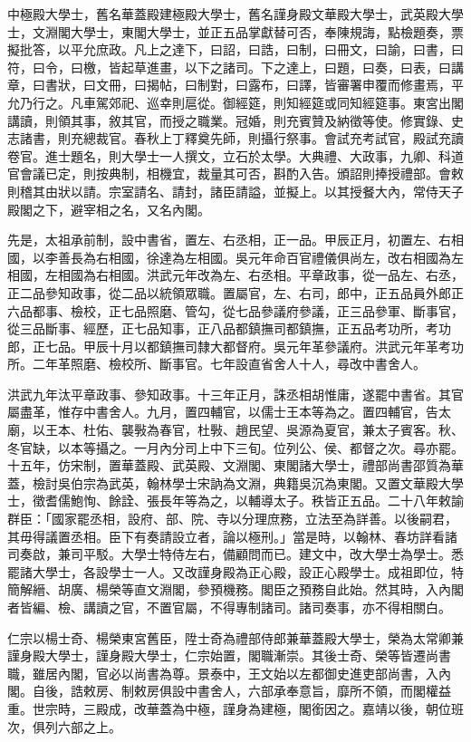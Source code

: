 中極殿大學士，舊名華蓋殿建極殿大學士，舊名謹身殿文華殿大學士，武英殿大學士，文淵閣大學士，東閣大學士，並正五品掌獻替可否，奉陳規誨，點檢題奏，票擬批答，以平允庶政。凡上之達下，曰詔，曰誥，曰制，曰冊文，曰諭，曰書，曰符，曰令，曰檄，皆起草進畫，以下之諸司。下之達上，曰題，曰奏，曰表，曰講章，曰書狀，曰文冊，曰揭帖，曰制對，曰露布，曰譯，皆審署申覆而修畫焉，平允乃行之。凡車駕郊祀、巡幸則扈從。御經筵，則知經筵或同知經筵事。東宮出閣講讀，則領其事，敘其官，而授之職業。冠婚，則充賓贊及納徵等使。修實錄、史志諸書，則充總裁官。春秋上丁釋奠先師，則攝行祭事。會試充考試官，殿試充讀卷官。進士題名，則大學士一人撰文，立石於太學。大典禮、大政事，九卿、科道官會議已定，則按典制，相機宜，裁量其可否，斟酌入告。頒詔則捧授禮部。會敕則稽其由狀以請。宗室請名、請封，諸臣請謚，並擬上。以其授餐大內，常侍天子殿閣之下，避宰相之名，又名內閣。

先是，太祖承前制，設中書省，置左、右丞相，正一品。甲辰正月，初置左、右相國，以李善長為右相國，徐達為左相國。吳元年命百官禮儀俱尚左，改右相國為左相國，左相國為右相國。洪武元年改為左、右丞相。平章政事，從一品左、右丞，正二品參知政事，從二品以統領眾職。置屬官，左、右司，郎中，正五品員外郎正六品都事、檢校，正七品照磨、管勾，從七品參議府參議，正三品參軍、斷事官，從三品斷事、經歷，正七品知事，正八品都鎮撫司都鎮撫，正五品考功所，考功郎，正七品。甲辰十月以都鎮撫司隸大都督府。吳元年革參議府。洪武元年革考功所。二年革照磨、檢校所、斷事官。七年設直省舍人十人，尋改中書舍人。

洪武九年汰平章政事、參知政事。十三年正月，誅丞相胡惟庸，遂罷中書省。其官屬盡革，惟存中書舍人。九月，置四輔官，以儒士王本等為之。置四輔官，告太廟，以王本、杜佑、襲斅為春官，杜斅、趙民望、吳源為夏官，兼太子賓客。秋、冬官缺，以本等攝之。一月內分司上中下三旬。位列公、侯、都督之次。尋亦罷。十五年，仿宋制，置華蓋殿、武英殿、文淵閣、東閣諸大學士，禮部尚書邵質為華蓋，檢討吳伯宗為武英，翰林學士宋訥為文淵，典籍吳沉為東閣。又置文華殿大學士，徵耆儒鮑恂、餘詮、張長年等為之，以輔導太子。秩皆正五品。二十八年敕諭群臣：「國家罷丞相，設府、部、院、寺以分理庶務，立法至為詳善。以後嗣君，其毋得議置丞相。臣下有奏請設立者，論以極刑。」當是時，以翰林、春坊詳看諸司奏啟，兼司平駁。大學士特侍左右，備顧問而已。建文中，改大學士為學士。悉罷諸大學士，各設學士一人。又改謹身殿為正心殿，設正心殿學士。成祖即位，特簡解縉、胡廣、楊榮等直文淵閣，參預機務。閣臣之預務自此始。然其時，入內閣者皆編、檢、講讀之官，不置官屬，不得專制諸司。諸司奏事，亦不得相關白。

仁宗以楊士奇、楊榮東宮舊臣，陞士奇為禮部侍郎兼華蓋殿大學士，榮為太常卿兼謹身殿大學士，謹身殿大學士，仁宗始置，閣職漸崇。其後士奇、榮等皆遷尚書職，雖居內閣，官必以尚書為尊。景泰中，王文始以左都御史進吏部尚書，入內閣。自後，誥敕房、制敕房俱設中書舍人，六部承奉意旨，靡所不領，而閣權益重。世宗時，三殿成，改華蓋為中極，謹身為建極，閣銜因之。嘉靖以後，朝位班次，俱列六部之上。

